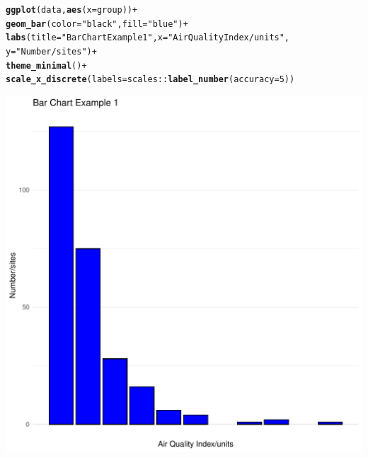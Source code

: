 \documentclass{article}\usepackage[]{graphicx}\usepackage[]{xcolor}
\makeatletter
\def\maxwidth{ %
  \ifdim\Gin@nat@width>\linewidth
    \linewidth
  \else
    \Gin@nat@width
  \fi
}
\newcommand{\hlnum}[1]{\textcolor[rgb]{0.686,0.059,0.569}{#1}}%
\newcommand{\hlstr}[1]{\textcolor[rgb]{0.192,0.494,0.8}{#1}}%
\newcommand{\hlopt}[1]{\textcolor[rgb]{0,0,0}{#1}}%
\newcommand{\hlstd}[1]{\textcolor[rgb]{0.345,0.345,0.345}{#1}}%
\newcommand{\hlkwc}[1]{\textcolor[rgb]{0.333,0.667,0.333}{#1}}%
\newcommand{\hlkwd}[1]{\textcolor[rgb]{0.737,0.353,0.396}{\textbf{#1}}}%
\newenvironment{kframe}{%
 \def\at@end@of@kframe{}%
 \ifinner\ifhmode%
  \def\at@end@of@kframe{\end{minipage}}%
  \begin{minipage}{\columnwidth}%
 \fi\fi%
 \def\FrameCommand##1{\hskip\@totalleftmargin \hskip-\fboxsep
 \colorbox{shadecolor}{##1}\hskip-\fboxsep
     \hskip-\linewidth \hskip-\@totalleftmargin \hskip\columnwidth}%
 \MakeFramed {\advance\hsize-\width
   \@totalleftmargin\z@ \linewidth\hsize
   \@setminipage}}%
 {\par\unskip\endMakeFramed%
 \at@end@of@kframe}
\newenvironment{knitrout}{}{} %
\makeatother
\begin{document}
\begin{knitrout}
\begin{kframe}
\begin{alltt}
\hlkwd{ggplot}\hlstd{(data,} \hlkwd{aes}\hlstd{(}\hlkwc{x} \hlstd{= group))} \hlopt{+}
  \hlkwd{geom_bar}\hlstd{(}\hlkwc{color}\hlstd{=}\hlstr{"black"}\hlstd{,}\hlkwc{fill}\hlstd{=}\hlstr{"blue"}\hlstd{)} \hlopt{+}
  \hlkwd{labs}\hlstd{(}\hlkwc{title} \hlstd{=} \hlstr{"Bar Chart Example 1"}\hlstd{,} \hlkwc{x} \hlstd{=} \hlstr{"Air Quality Index/units"}\hlstd{,}
       \hlkwc{y} \hlstd{=} \hlstr{"Number/sites"}\hlstd{)} \hlopt{+}
  \hlkwd{theme_minimal}\hlstd{()} \hlopt{+}
  \hlkwd{scale_x_discrete}\hlstd{(}\hlkwc{labels} \hlstd{= scales}\hlopt{::}\hlkwd{label_number}\hlstd{(}\hlkwc{accuracy} \hlstd{=} \hlnum{5}\hlstd{))}
\end{alltt}
\end{kframe}
\includegraphics[width=\maxwidth]{figure/my_plot3-1} 
\end{knitrout}
\end{document}
